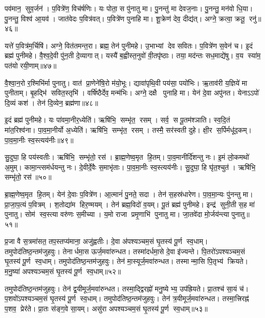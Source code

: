 पव॑मान॒ सुव॒र्जन॑।
प॒वित्रे॑ण॒ विच॑र्\mbox{}षणिः।
यः पोता॒ स पु॑नातु मा।
पु॒नन्तु॑ मा देवज॒नाः।
पु॒नन्तु॒ मन॑वो धि॒या।
पु॒नन्तु॒ विश्व॑ आ॒यव॑।
जात॑वेदः प॒वित्र॑वत्।
प॒वित्रे॑ण पुनाहि मा।
शू॒क्रेण॑ देव॒ दीद्य॑त्।
अग्ने॒ क्रत्वा॒ क्रतू॒ रनु॑॥४६॥

यत्ते॑ प॒वित्र॑म॒र्चिषि॑।
अग्ने॒ वित॑तमन्त॒रा।
ब्रह्म॒ तेन॑ पुनीमहे।
उ॒भाभ्यां देव सवितः।
प॒वित्रे॑ण स॒वेन॑ च।
इ॒दं ब्रह्म॑ पुनीमहे।
वै॒श्व॒दे॒वी पु॑न॒ती दे॒व्यागात्।
यस्यै॑ ब॒ह्वीस्त॒नुवो॑ वी॒तपृ॑ष्ठाः।
तया॒ मद॑न्तः सध॒माद्ये॑षु।
व॒य स्या॑म॒ पत॑यो रयी॒णाम्॥४७॥

वै॒श्वा॒न॒रो र॒श्मिभि॑र्मा पुनातु।
वात॑ प्रा॒णेने॑षि॒रो म॑यो॒भूः।
द्यावा॑पृथि॒वी पय॑सा॒ पयो॑भिः।
ऋ॒ताव॑री य॒ज्ञिये॑ मा पुनीताम्।
बृ॒हद्भि॑ सवित॒स्तृभि॑।
वर्\mbox{}षि॑ष्ठैर्देव॒ मन्म॑भिः।
अग्ने॒ दक्षै पुनाहि मा।
येन॑ दे॒वा अपु॑नत।
येनाऽऽपो॑ दि॒व्यं कश॑।
तेन॑ दि॒व्येन॒ ब्रह्म॑णा॥४८॥

इ॒दं ब्रह्म॑ पुनीमहे।
यः पा॑वमा॒नीर॒ध्येति॑।
ऋषि॑भि॒ सम्भृ॑त॒ रसम्।
सर्व॒ स पू॒तम॑श्ञाति।
स्व॒दि॒तं मा॑त॒रिश्व॑ना।
पा॒व॒मा॒नीर्यो अ॒ध्येति॑।
ऋषि॑भि॒ सम्भृ॑त॒ रसम्।
तस्मै॒ सर॑स्वती दुहे।
क्षी॒र स॒र्पिर्मधू॑द॒कम्।
पा॒व॒मा॒नीः स्व॒स्त्यय॑नीः॥४९॥

सु॒दुघा॒ हि पय॑स्वतीः।
ऋषि॑भि॒ सम्भृ॑तो॒ रस॑।
ब्रा॒ह्म॒णेष्व॒मृत हि॒तम्।
पा॒व॒मानीर्दि॑शन्तु नः।
इ॒मं लो॒कमथो॑ अ॒मुम्।
कामा॒न्त्सम॑र्धयन्तु नः।
दे॒वीर्दे॒वैः स॒माभृ॑ताः।
पा॒व॒मा॒नीः स्व॒स्त्यय॑नीः।
सु॒दुघा॒ हि घृ॑त॒श्चुत॑।
ऋषि॑भि॒ सम्भृ॑तो॒ रस॑॥५०॥

ब्रा॒ह्म॒णेष्व॒मृत हि॒तम्।
येन॑ दे॒वाः प॒वित्रे॑ण।
आ॒त्मानं॑ पु॒नते॒ सदा।
तेन॑ स॒हस्र॑धारेण।
पा॒व॒मा॒न्यः पु॑नन्तु मा।
प्रा॒जा॒प॒त्यं प॒वित्रम्।
श॒तोद्या॑म हिर॒ण्मयम्।
तेन॑ ब्रह्म॒विदो॑ व॒यम्।
पू॒तं ब्रह्म॑ पुनीमहे।
इन्द्र॑ सुनी॒ती स॒ह मा॑ पुनातु।
सोम॑ स्व॒स्त्या वरु॑णः स॒मीच्या।
य॒मो राजा प्रमृ॒णाभि॑ पुनातु मा।
जा॒तवे॑दा मो॒र्जय॑न्त्या पुनातु॥५१॥\anuvakamend[अनु॑ रयी॒णां ब्रह्म॑णा स्व॒स्त्यय॑नीः सु॒दुघा॒ हि घृ॑त॒श्चुत॒ ऋषि॑भि॒ सम्भृ॑तो॒ रस॑ पुनातु॒ त्रीणि॑ च]

प्र॒जा वै स॒त्रमा॑सत॒ तप॒स्तप्य॑माना॒ अजु॑ह्वतीः।
दे॒वा अ॑पश्यञ्चम॒सं घृ॒तस्य॑ पू॒र्ण स्व॒धाम्।
तमुपोद॑तिष्ठ॒न्तम॑जुहवुः।
तेनार्धमा॒स ऊर्ज॒मवा॑रुन्धत।
तस्मा॑दर्धमा॒से दे॒वा इ॑ज्यन्ते।
पि॒तरो॑ऽपश्यञ्चम॒सं घृ॒तस्य॑ पू॒र्ण स्व॒धाम्।
तमुपोद॑तिष्ठ॒न्तम॑जुहवुः।
तेन॑ मा॒स्यूर्ज॒मवा॑रुन्धत।
तस्मान्मा॒सि पि॒तृभ्य॑ क्रियते।
म॒नु॒ष्या॑ अपश्यञ्चम॒सं घृ॒तस्य॑ पू॒र्ण स्व॒धाम्॥५२॥

तमुपोद॑तिष्ठ॒न्तम॑जुहवुः।
तेन॑ द्व॒यीमूर्ज॒मवा॑रुन्धत।
तस्मा॒द्द्विरह्नो॑ मनु॒ष्येभ्य॒ उप॑ह्रियते।
प्रा॒तश्च॑ सा॒यं च॑।
प॒शवो॑ऽपश्यञ्चम॒सं घृ॒तस्य॑ पू॒र्ण स्व॒धाम्।
तमुपोद॑तिष्ठ॒न्त\-म॑जुहवुः।
तेन॑ त्र॒यीमूर्ज॒मवा॑रुन्धत।
तस्मा॒त्त्रिरह्न॑ प॒शव॒ प्रेर॑ते।
प्रा॒तः स॑ङ्ग॒वे सा॒यम्।
असु॑रा अपश्यञ्चम॒सं घृ॒तस्य॑ पू॒र्ण स्व॒धाम्॥५३॥

